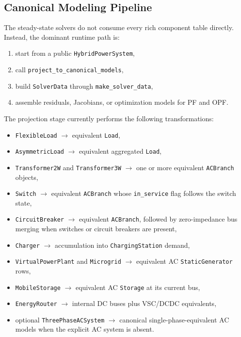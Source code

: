 \subsection{Canonical Modeling Pipeline}

The steady-state solvers do not consume every rich component table directly.
Instead, the dominant runtime path is:
\begin{enumerate}
  \item start from a public \texttt{HybridPowerSystem},
  \item call \texttt{project\_to\_canonical\_models},
  \item build \texttt{SolverData} through \texttt{make\_solver\_data},
  \item assemble residuals, Jacobians, or optimization models for PF and OPF.
\end{enumerate}

The projection stage currently performs the following transformations:
\begin{itemize}
  \item \texttt{FlexibleLoad} $\rightarrow$ equivalent \texttt{Load},
  \item \texttt{AsymmetricLoad} $\rightarrow$ equivalent aggregated \texttt{Load},
  \item \texttt{Transformer2W} and \texttt{Transformer3W} $\rightarrow$ one or more equivalent \texttt{ACBranch} objects,
  \item \texttt{Switch} $\rightarrow$ equivalent \texttt{ACBranch} whose \texttt{in\_service} flag follows the switch state,
  \item \texttt{CircuitBreaker} $\rightarrow$ equivalent \texttt{ACBranch}, followed by zero-impedance bus merging when switches or circuit breakers are present,
  \item \texttt{Charger} $\rightarrow$ accumulation into \texttt{ChargingStation} demand,
  \item \texttt{VirtualPowerPlant} and \texttt{Microgrid} $\rightarrow$ equivalent AC \texttt{StaticGenerator} rows,
  \item \texttt{MobileStorage} $\rightarrow$ equivalent AC \texttt{Storage} at its current bus,
  \item \texttt{EnergyRouter} $\rightarrow$ internal DC buses plus VSC/DCDC equivalents,
  \item optional \texttt{ThreePhaseACSystem} $\rightarrow$ canonical single-phase-equivalent AC models when the explicit AC system is absent.
\end{itemize}

